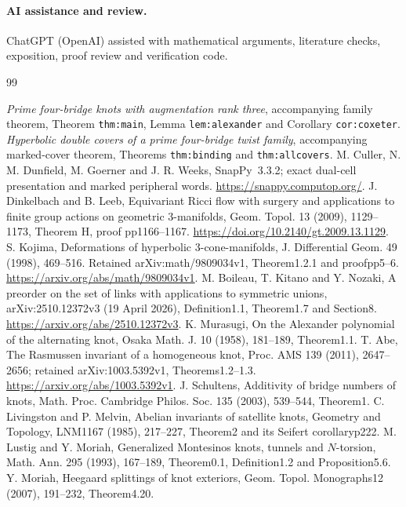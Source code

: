 \documentclass[11pt]{article}
\begin{document}
\paragraph{AI assistance and review.}
ChatGPT (OpenAI) assisted with mathematical arguments, literature checks,
exposition, proof review and verification code.

\begin{thebibliography}{99}\small\raggedright
{} \emph{Prime four-bridge knots with augmentation rank
three}, accompanying family theorem, Theorem \texttt{thm:main},
Lemma \texttt{lem:alexander} and Corollary \texttt{cor:coxeter}.
 \emph{Hyperbolic double covers of a prime four-bridge
twist family}, accompanying marked-cover theorem,
Theorems \texttt{thm:binding} and \texttt{thm:allcovers}.
 M. Culler, N. M. Dunfield, M. Goerner and J. R. Weeks,
SnapPy~3.3.2; exact dual-cell presentation and marked peripheral words.
\url{https://snappy.computop.org/}.
 J. Dinkelbach and B. Leeb, Equivariant Ricci flow with
surgery and applications to finite group actions on geometric
3-manifolds, Geom. Topol. 13 (2009), 1129--1173,
Theorem H, proof pp1166--1167.
\url{https://doi.org/10.2140/gt.2009.13.1129}.
 S. Kojima, Deformations of hyperbolic 3-cone-manifolds,
J. Differential Geom. 49 (1998), 469--516.
Retained arXiv:math/9809034v1, Theorem1.2.1 and proofpp5--6.
\url{https://arxiv.org/abs/math/9809034v1}.
 M. Boileau, T. Kitano and Y. Nozaki,
A preorder on the set of links with applications to symmetric unions,
arXiv:2510.12372v3 (19 April 2026), Definition1.1,
Theorem1.7 and Section8. \url{https://arxiv.org/abs/2510.12372v3}.
 K. Murasugi, On the Alexander polynomial of the
alternating knot, Osaka Math. J. 10 (1958), 181--189, Theorem1.1.
 T. Abe, The Rasmussen invariant of a homogeneous knot,
Proc. AMS 139 (2011), 2647--2656; retained arXiv:1003.5392v1,
Theorems1.2--1.3. \url{https://arxiv.org/abs/1003.5392v1}.
 J. Schultens, Additivity of bridge numbers of knots,
Math. Proc. Cambridge Philos. Soc. 135 (2003), 539--544, Theorem1.
 C. Livingston and P. Melvin, Abelian invariants of satellite
knots, Geometry and Topology, LNM1167 (1985), 217--227, Theorem2
and its Seifert corollaryp222.
 M. Lustig and Y. Moriah, Generalized Montesinos knots,
tunnels and $N$-torsion, Math. Ann. 295 (1993), 167--189,
Theorem0.1, Definition1.2 and Proposition5.6.
 Y. Moriah, Heegaard splittings of knot exteriors,
Geom. Topol. Monographs12 (2007), 191--232, Theorem4.20.

\end{thebibliography}
\end{document}
